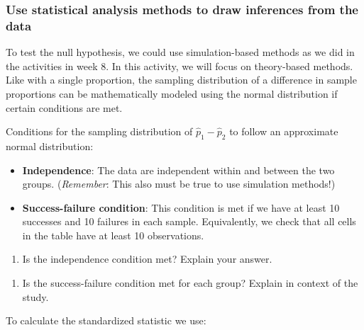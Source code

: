 \documentclass[
]{report}
\providecommand{\tightlist}{%
  \setlength{\itemsep}{0pt}\setlength{\parskip}{0pt}}
\begin{document}
\hypertarget{use-statistical-analysis-methods-to-draw-inferences-from-the-data-3}{%
\subsubsection*{Use statistical analysis methods to draw inferences from the data}\label{use-statistical-analysis-methods-to-draw-inferences-from-the-data-3}}

To test the null hypothesis, we could use simulation-based methods as we did in the activities in week 8. In this activity, we will focus on theory-based methods. Like with a single proportion, the sampling distribution of a difference in sample proportions can be mathematically modeled using the normal distribution if certain conditions are met.

Conditions for the sampling distribution of \(\hat{p}_1-\hat{p}_2\) to follow an approximate normal distribution:

\begin{itemize}
\item
  \textbf{Independence}: The data are independent within and between the two groups. (\emph{Remember}: This also must be true to use simulation methods!)
\item
  \textbf{Success-failure condition}: This condition is met if we have at least 10 successes and 10 failures in each sample. Equivalently, we check that all cells in the table have at least 10 observations.
\end{itemize}

\begin{enumerate}
\def\labelenumi{\arabic{enumi}.}
\setcounter{enumi}{4}
\tightlist
\item
  Is the independence condition met? Explain your answer.
\end{enumerate}

\vspace{0.4in}

\begin{enumerate}
\def\labelenumi{\arabic{enumi}.}
\setcounter{enumi}{5}
\tightlist
\item
  Is the success-failure condition met for each group? Explain in context of the study.
\end{enumerate}

\vspace{0.8in}

To calculate the standardized statistic we use:
\end{document}
